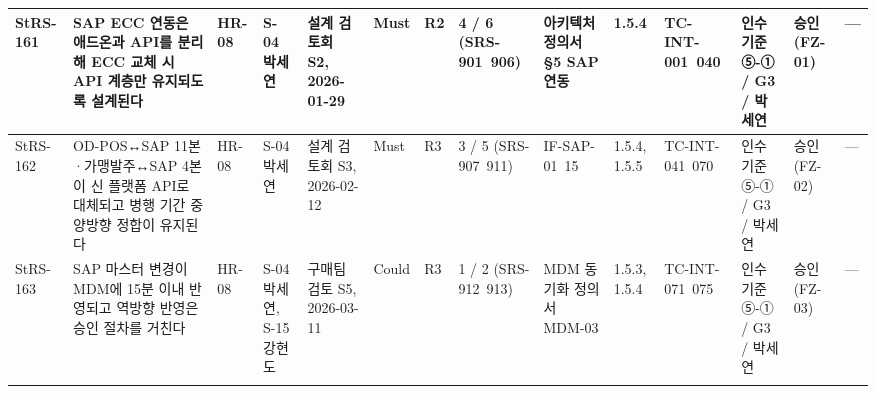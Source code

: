 \documentclass[10pt,a4paper]{article}
\begin{document}
{\begin{longtable}{|L{11mm}|L{42mm}|L{9mm}|L{15mm}|L{16mm}|L{11mm}|L{12mm}|L{15mm}|L{18mm}|L{12mm}|L{19mm}|L{22mm}|L{11mm}|L{22mm}|}
StRS-161 & SAP ECC 연동은 애드온과 API를 분리해 ECC 교체 시 API 계층만 유지되도록 설계된다 & HR-08 & S-04 박세연 & 설계 검토회 S2, 2026-01-29 & Must & R2 & 4 / 6 (SRS-901~906) & 아키텍처 정의서 §5 SAP 연동 & 1.5.4 & TC-INT-001~040 & 인수 기준 ⑤-① / G3 / 박세연 & 승인 (FZ-01) & — \\ \hline
StRS-162 & OD-POS↔SAP 11본·가맹발주↔SAP 4본이 신 플랫폼 API로 대체되고 병행 기간 중 양방향 정합이 유지된다 & HR-08 & S-04 박세연 & 설계 검토회 S3, 2026-02-12 & Must & R3 & 3 / 5 (SRS-907~911) & IF-SAP-01~15 & 1.5.4, 1.5.5 & TC-INT-041~070 & 인수 기준 ⑤-① / G3 / 박세연 & 승인 (FZ-02) & — \\ \hline
StRS-163 & SAP 마스터 변경이 MDM에 15분 이내 반영되고 역방향 반영은 승인 절차를 거친다 & HR-08 & S-04 박세연, S-15 강현도 & 구매팀 검토 S5, 2026-03-11 & Could & R3 & 1 / 2 (SRS-912~913) & MDM 동기화 정의서 MDM-03 & 1.5.3, 1.5.4 & TC-INT-071~075 & 인수 기준 ⑤-① / G3 / 박세연 & 승인 (FZ-03) & — \\ \hline
\fi
\end{longtable}}
\end{document}
